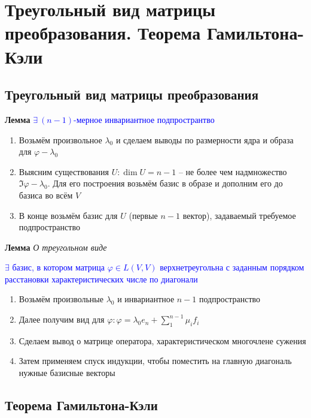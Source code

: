 \documentclass[a4paper, 14pt]{article}
\begin{document}
    \section{Треугольный вид матрицы преобразования.
    Теорема Гамильтона-Кэли}
    
    \subsection{Треугольный вид матрицы преобразования}
    
    \textbf{Лемма} \textcolor{blue}{$\exists~(n-1)$-мерное инвариантное подпространтво}
    
    \begin{enumerate}
        \item Возьмём произвольное $\lambda_0$ и сделаем выводы по размерности ядра и образа для $\varphi - \lambda_0$
        \item Выясним существования $U: \dim U = n - 1$ -- не более чем надмножество $\Im \varphi - \lambda_0$.
        Для его построения возьмём базис в образе и дополним его до базиса во всём $V$
        \item В конце возьмём базис для $U$ (первые $n-1$ вектор), задаваемый требуемое подпространство
    \end{enumerate}
    
    \textbf{Лемма} \textit{О треугольном виде}
    
    \textcolor{blue}{$\exists$ базис, в котором матрица $\varphi \in L(V, V)$ верхнетреугольна с
    заданным порядком расстановки характеристических числе по диагонали}
    
    \begin{enumerate}
        \item Возьмём произвольные $\lambda_0$ и инвариантное $n - 1$ подпространство
        \item Далее получим вид для $\varphi: \varphi = \lambda_0 e_n + \sum_1^{n-1} \mu_i f_i$
        \item Сделаем вывод о матрице оператора, характеристическом многочлене сужения
        \item Затем применяем спуск индукции, чтобы поместить на главную диагональ нужные базисные векторы
    \end{enumerate}
    
    \subsection{Теорема Гамильтона-Кэли}
    
\end{document}
